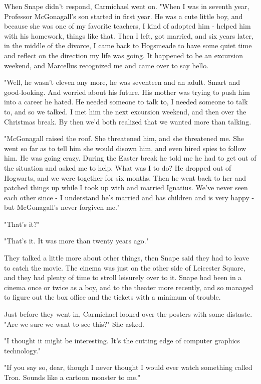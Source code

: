 When Snape didn't respond, Carmichael went on. "When I was in seventh year, Professor McGonagall's son started in first year. He was a cute little boy, and because she was one of my favorite teachers, I kind of adopted him - helped him with his homework, things like that. Then I left, got married, and six years later, in the middle of the divorce, I came back to Hogsmeade to have some quiet time and reflect on the direction my life was going. It happened to be an excursion weekend, and Marcellus recognized me and came over to say hello.

"Well, he wasn't eleven any more, he was seventeen and an adult. Smart and good-looking. And worried about his future. His mother was trying to push him into a career he hated. He needed someone to talk to, I needed someone to talk to, and so we talked. I met him the next excursion weekend, and then over the Christmas break. By then we'd both realized that we wanted more than talking.

"McGonagall raised the roof. She threatened him, and she threatened me. She went so far as to tell him she would disown him, and even hired spies to follow him. He was going crazy. During the Easter break he told me he had to get out of the situation and asked me to help. What was I to do? He dropped out of Hogwarts, and we were together for six months. Then he went back to her and patched things up while I took up with and married Ignatius. We've never seen each other since - I understand he's married and has children and is very happy - but McGonagall's never forgiven me."

"That's it?"

"That's it. It was more than twenty years ago."

They talked a little more about other things, then Snape said they had to leave to catch the movie. The cinema was just on the other side of Leicester Square, and they had plenty of time to stroll leisurely over to it. Snape had been in a cinema once or twice as a boy, and to the theater more recently, and so managed to figure out the box office and the tickets with a minimum of trouble.

Just before they went in, Carmichael looked over the posters with some distaste. "Are we sure we want to see this?" She asked.

"I thought it might be interesting. It's the cutting edge of computer graphics technology."

"If you say so, dear, though I never thought I would ever watch something called Tron. Sounds like a cartoon monster to me."

